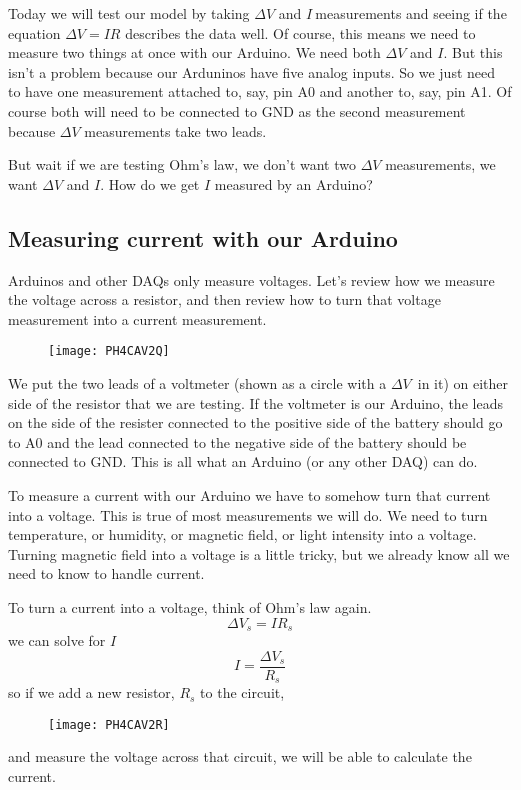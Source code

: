 Today we will test our model by taking $\Delta V$ and $I\ $measurements and
seeing if the equation $\Delta V=IR$ describes the data well. Of course,
this means we need to measure two things at once with our Arduino. We need
both $\Delta V$ and $I.$ But this isn't a problem because our Arduninos have
five analog inputs. So we just need to have one measurement attached to,
say, pin A0 and another to, say, pin A1. Of course both will need to be
connected to GND as the second measurement because $\Delta V$ measurements
take two leads.

But wait if we are testing Ohm's law, we don't want two $\Delta V$
measurements, we want $\Delta V$ and $I.$ How do we get $I$ measured by an
Arduino?

\subsection{Measuring current with our Arduino}

Arduinos and other DAQs only measure voltages. Let's review how we measure
the voltage across a resistor, and then review how to turn that voltage
measurement into a current measurement.

\begin{figure}[h!]
\texttt{[image: PH4CAV2Q]}
\end{figure}We put the two leads of a
voltmeter (shown as a circle with a $\Delta V$\ in it) on either side of the
resistor that we are testing. If the voltmeter is our Arduino, the leads on
the side of the resister connected to the positive side of the battery
should go to A0 and the lead connected to the negative side of the battery
should be connected to GND. This is all what an Arduino (or any other DAQ)
can do.

To measure a current with our Arduino we have to somehow turn that current
into a voltage. This is true of most measurements we will do. We need to
turn temperature, or humidity, or magnetic field, or light intensity into a
voltage. Turning magnetic field into a voltage is a little tricky, but we
already know all we need to know to handle current.

To turn a current into a voltage, think of Ohm's law again.%
\begin{equation*}
\Delta V_{s}=IR_{s}
\end{equation*}%
we can solve for $I$%
\begin{equation*}
I=\frac{\Delta V_{s}}{R_{s}}
\end{equation*}%
so if we add a new resistor, $R_{s}$ to the circuit, \begin{figure}[h!]
\texttt{[image: PH4CAV2R]}
\end{figure}and measure the voltage across
that circuit, we will be able to calculate the current.

